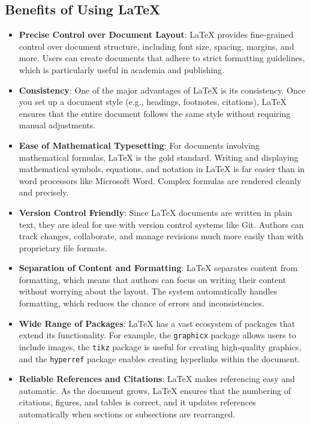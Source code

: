 \subsection{Benefits of Using LaTeX}

\begin{itemize}
    \item \textbf{Precise Control over Document Layout}: LaTeX provides fine-grained control over document structure, including font size, spacing, margins, and more. Users can create documents that adhere to strict formatting guidelines, which is particularly useful in academia and publishing.
    \item \textbf{Consistency}: One of the major advantages of LaTeX is its consistency. Once you set up a document style (e.g., headings, footnotes, citations), LaTeX ensures that the entire document follows the same style without requiring manual adjustments.
    \item \textbf{Ease of Mathematical Typesetting}: For documents involving mathematical formulas, LaTeX is the gold standard. Writing and displaying mathematical symbols, equations, and notation in LaTeX is far easier than in word processors like Microsoft Word. Complex formulas are rendered cleanly and precisely.
    \item \textbf{Version Control Friendly}: Since LaTeX documents are written in plain text, they are ideal for use with version control systems like Git. Authors can track changes, collaborate, and manage revisions much more easily than with proprietary file formats.
    \item \textbf{Separation of Content and Formatting}: LaTeX separates content from formatting, which means that authors can focus on writing their content without worrying about the layout. The system automatically handles formatting, which reduces the chance of errors and inconsistencies.
    \item \textbf{Wide Range of Packages}: LaTeX has a vast ecosystem of packages that extend its functionality. For example, the \texttt{graphicx} package allows users to include images, the \texttt{tikz} package is useful for creating high-quality graphics, and the \texttt{hyperref} package enables creating hyperlinks within the document.
    \item \textbf{Reliable References and Citations}: LaTeX makes referencing easy and automatic. As the document grows, LaTeX ensures that the numbering of citations, figures, and tables is correct, and it updates references automatically when sections or subsections are rearranged.

\end{itemize}
